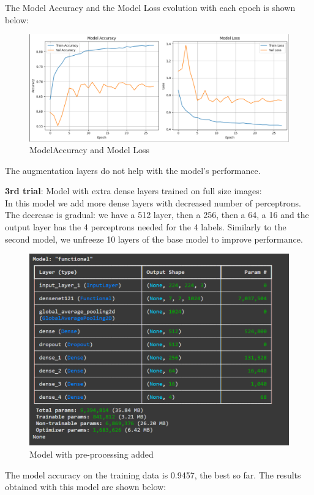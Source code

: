 \documentclass{article}
\begin{document}
The Model Accuracy and the Model Loss evolution with each epoch is shown below:

\begin{figure}[H]
    \centering
    \includegraphics[width=0.8\linewidth]{DN121graph1.png}
    \caption{ModelAccuracy and Model Loss}
    \label{fig:DN121graph1}
\end{figure}

The augmentation layers do not help with the model's performance.

\textbf{3rd trial}: Model with extra dense layers trained on full size images:\\
In this model we add more dense layers with decreased number of perceptrons. The decrease is gradual: we have a 512 layer, then a 256, then a 64, a 16 and the output layer has the 4 perceptrons needed for the 4 labels. 
Similarly to the second model, we unfreeze 10 layers of the base model to improve performance.

\begin{figure}[H]
    \centering
    \includegraphics[width=0.8\linewidth]{DN121arch2.png}
    \caption{Model with pre-processing added}
    \label{fig:DN121arch2}
\end{figure}

The model accuracy on the training data is 0.9457, the best so far. The results obtained with this model are shown below:
\end{document}
